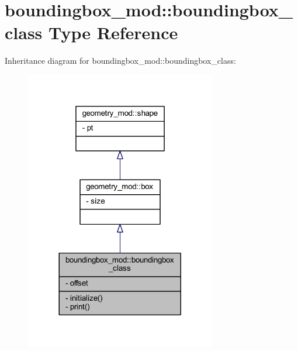 \hypertarget{structboundingbox__mod_1_1boundingbox__class}{}\section{boundingbox\+\_\+mod\+:\+:boundingbox\+\_\+class Type Reference}
\label{structboundingbox__mod_1_1boundingbox__class}


Inheritance diagram for boundingbox\+\_\+mod\+:\+:boundingbox\+\_\+class\+:
\nopagebreak
\begin{figure}[H]
\begin{center}
\leavevmode
\includegraphics[width=236pt]{structboundingbox__mod_1_1boundingbox__class__inherit__graph}
\end{center}
\end{figure}


